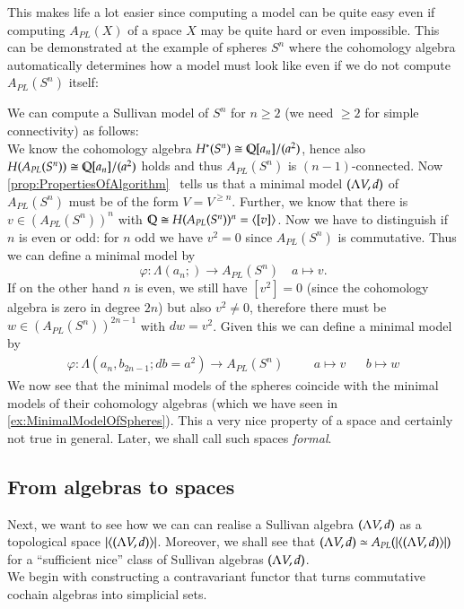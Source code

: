  This makes life a lot easier since computing a model can be quite easy even if
 computing $A_{PL}(X)$ of a space $X$ may be quite hard or even impossible. This can be 
 demonstrated at the example of spheres $S^n$ where the cohomology algebra automatically determines how a model must look like
 even if we do not compute $A_{PL}(S^n)$ itself:
 \begin{Example}
 \label{ex:MinimalModelOfSpheresAPL}
  We can compute a Sullivan model of $S^n$ for $n \geq 2$ (we need $\geq 2$ for simple connectivity)
  as follows: \\ We know the cohomology algebra $H^*(S^n) \cong \mathbb{Q}[a_n]/(a^2)$, hence also
  $H(A_{PL}(S^n)) \cong \mathbb{Q}[a_n]/(a^2)$ holds and thus $A_{PL}(S^n)$ is $(n-1)$-connected.
  Now \ref{prop:PropertiesOfAlgorithm}~ tells us that a minimal model $(\Lambda V,d)$ of $A_{PL}(S^n)$ must be 
  of the form $V = V^{\geq n}$. Further, we know that there is $v \in (A_{PL}(S^n))^n$ with 
  $\mathbb{Q} \cong H(A_{PL}(S^n))^n = \langle [v] \rangle$. Now we have to distinguish if $n$ is even or odd:
  for $n$ odd  we have $v^2 = 0$ since $A_{PL}(S^n)$ is commutative. Thus we can define
  a minimal model by 
  $$\varphi \colon \Lambda(a_n;) \to A_{PL}(S^n) \quad  a \mapsto v.$$
  If on the other hand $n$ is even, we still have $[v^2] = 0$ (since the cohomology algebra is zero in degree $2n$)
  but also $v^2 \neq 0$, therefore there must be $w \in (A_{PL}(S^n))^{2n-1}$ with $dw = v^2$. Given this we can define
  a minimal model by
  \begin{align*}
  \varphi \colon \Lambda(a_n, b_{2n-1} ; db = a^2) \to A_{PL}(S^n)& &  &a \mapsto v 
   & &b \mapsto w
  \end{align*}
  We now see that the minimal models of the spheres coincide with the minimal models of their cohomology algebras 
  (which we have seen in \ref{ex:MinimalModelOfSpheres}). This a very nice property of a space 
  and certainly not true in general. Later, we shall call such spaces \emph{formal}.
 \end{Example}

 
 
 \subsection{From algebras to spaces}
 
 Next, we want to see how we can can realise a Sullivan algebra $(\Lambda V,d)$ as a topological space 
 $| \langle (\Lambda V,d) \rangle |$. Moreover, we shall see that $(\Lambda V,d) \simeq A_{PL}(| \langle (\Lambda V,d) \rangle |)$ for a
 ``sufficient nice'' class of Sullivan algebras $(\Lambda V,d)$. \\
 We begin with constructing a contravariant functor that turns commutative cochain algebras into simplicial sets.
 
